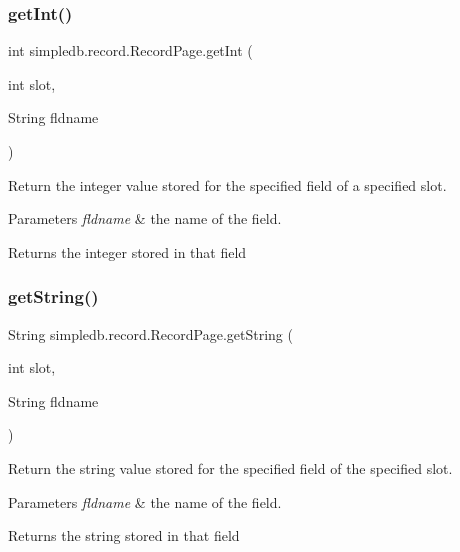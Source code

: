 \subsubsection{\texorpdfstring{get\+Int()}{getInt()}}
{\footnotesize\ttfamily int simpledb.\+record.\+Record\+Page.\+get\+Int (\begin{DoxyParamCaption}\item[{int}]{slot,  }\item[{String}]{fldname }\end{DoxyParamCaption})\hspace{0.3cm}{\ttfamily [inline]}}

Return the integer value stored for the specified field of a specified slot. 
\begin{DoxyParams}{Parameters}
{\em fldname} & the name of the field. \\
\hline
\end{DoxyParams}
\begin{DoxyReturn}{Returns}
the integer stored in that field 
\end{DoxyReturn}
\mbox{\label{classsimpledb_1_1record_1_1RecordPage_aa304049fd993d08097e8e0e6e5877810}} 
\subsubsection{\texorpdfstring{get\+String()}{getString()}}
{\footnotesize\ttfamily String simpledb.\+record.\+Record\+Page.\+get\+String (\begin{DoxyParamCaption}\item[{int}]{slot,  }\item[{String}]{fldname }\end{DoxyParamCaption})\hspace{0.3cm}{\ttfamily [inline]}}

Return the string value stored for the specified field of the specified slot. 
\begin{DoxyParams}{Parameters}
{\em fldname} & the name of the field. \\
\hline
\end{DoxyParams}
\begin{DoxyReturn}{Returns}
the string stored in that field 
\end{DoxyReturn}
\mbox{\label{classsimpledb_1_1record_1_1RecordPage_ade07f28ec8ebd2f9b5635fdaf2aa1b93}} 
